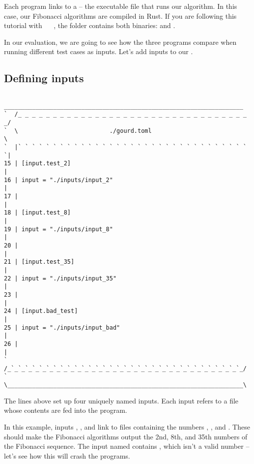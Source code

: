 \documentclass[a4paper,english]{article}
\begin{document}
\begin{adjustwidth}{18pt}{0pt}
    Each program links to a  -- the executable file that runs our
    algorithm. In this case, our Fibonacci algorithms are compiled in Rust.
    If you are following this tutorial with
    ~
    ~,
    the folder contains both binaries:
     and .

    In our evaluation, we are going to see how the three programs compare when
    running different test cases as inputs.
    Let's add inputs to our .

    \subsection{Defining inputs}

    \begin{verbatim}
    ____________________________________________________________________
`  /_ _ _ _ _ _ _ _ _ _ _ _ _ _ _ _ _ _ _ _ _ _ _ _ _ _ _ _ _ _ _ _ _ _/
`  \                          ./gourd.toml                             \
`  |` ` ` ` ` ` ` ` ` ` ` ` ` ` ` ` ` ` ` ` ` ` ` ` ` ` ` ` ` ` ` ` ` `|
15 | [input.test_2]                                                    |
16 | input = "./inputs/input_2"                                        |
17 |                                                                   |
18 | [input.test_8]                                                    |
19 | input = "./inputs/input_8"                                        |
20 |                                                                   |
21 | [input.test_35]                                                   |
22 | input = "./inputs/input_35"                                       |
23 |                                                                   |
24 | [input.bad_test]                                                  |
25 | input = "./inputs/input_bad"                                      |
26 |                                                                   |
`  /_`_`_`_`_`_`_`_`_`_`_`_`_`_`_`_`_`_`_`_`_`_`_`_`_`_`_`_`_`_`_`_`_`_/
`  \___________________________________________________________________\

    \end{verbatim}

    The lines above set up four uniquely named inputs.
    Each input refers to a file whose contents are fed into the program.

    In this example, inputs , , and 
    link to files containing the numbers \File{2}, \File{8}, and \File{35}.
    These should make the Fibonacci algorithms output the 2nd, 8th, and 35th
    numbers of the Fibonacci sequence.
    The input named  contains , which isn't
    a valid number -- let's see how this will crash the programs.


\end{adjustwidth}
\end{document}
